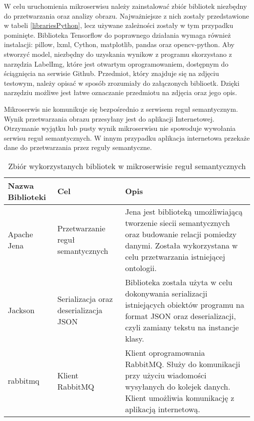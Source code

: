 W celu uruchomienia mikroserwisu należy zainstalować zbiór bibliotek niezbędny do przetwarzania oraz analizy obrazu. Najważniejsze z nich zostały przedstawione w tabeli \ref{librariesPython}, lecz używane zależności zostały w tym przypadku pominięte. Biblioteka Tensorflow do poprawnego działania wymaga również instalacji: pillow, lxml, Cython, matplotlib, pandas oraz opencv-python. Aby stworzyć model, niezbędny do uzyskania wynikow z programu skorzystano z narzędzia LabelImg, które jest otwartym oprogramowaniem, dostępnym do ściągnięcia na serwisie Github. Przedmiot, który znajduje się na zdjęciu testowym, należy opisać w sposób zrozumiały do załączonych biblioetk. Dzięki narzędziu możliwe jest łatwe oznaczanie przedmiotu na zdjęcia oraz jego opis. 

Mikroserwis nie komunikuje się bezpośrednio z serwisem reguł semantycznym. Wynik przetwarzania obrazu przesyłany jest do aplikacji Internetowej. Otrzymanie wyjątku lub pusty wynik mikroserwisu nie spowoduje wywołania serwisu reguł semantycznych. W innym przypadku aplikacja internetowa przekaże dane do przetwarzania przez reguły semantyczne. 


\begin{center}
	\begin{longtable}{ | p{3.1cm} | p{4cm} | p{6.5cm} |}
		\caption{Zbiór wykorzystanych bibliotek w mikroserwisie reguł semantycznych}
		\label{librariesJava} \\
		\hline Nazwa \newline Biblioteki & Cel & Opis \\ \hline    
		
		\hline Apache Jena &
		Przetwarzanie reguł semantycznych
		
		& Jena jest biblioteką umożliwiającą tworzenie siecii semantycznych oraz budowanie relacji pomiedzy danymi. Została wykorzystana w celu przetwarzania istniejącej ontologii. \\ \hline
		
		\hline Jackson &
		Serializacja oraz deserializacja JSON
		
		& Biblioteka została użyta w celu dokonywania serializacji istniejących obiektów programu na format JSON oraz deserializacji, czyli zamiany tekstu na instancje klasy.\\ \hline
		
		\hline rabbitmq &
		Klient RabbitMQ
	
		& Klient oprogramowania RabbitMQ. Służy do komunikacji przy użyciu wiadomości wysyłanych do kolejek danych. Klient umożliwia komunikację z aplikacją internetową.\\ \hline

	\end{longtable}
\end{center}


